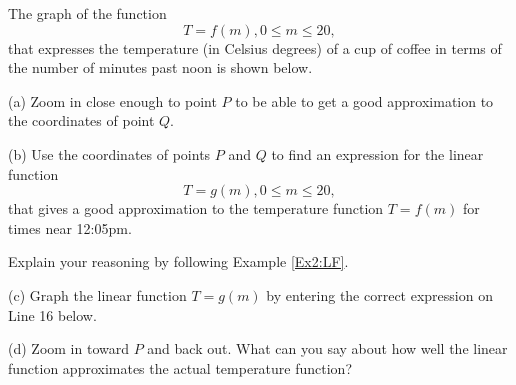 \documentclass{ximera}
\begin{document}
\begin{example} \label{Ex3:LF} The graph of the function
\[
    T = f(m) , 0\leq m \leq 20 ,
\]
that expresses the temperature (in Celsius degrees) of a cup of coffee in terms of the number of minutes past noon is shown below. 

\begin{exploration}\label{Exp1:LF}

(a) Zoom in close enough to point $P$ to be able to get a good approximation to the coordinates of point $Q$. 

(b) Use the coordinates of points $P$ and $Q$ to find an expression for the linear function 
\[
  T = g(m) , 0\leq m \leq 20,
\]
that gives a good approximation to the temperature function $T=f(m)$ for times near 12:05pm. 

Explain your reasoning by following Example \ref{Ex2:LF}.

(c) Graph the linear function $T=g(m)$ by entering the correct expression on Line 16 below.

(d) Zoom in toward $P$ and back out. What can you say about how well the linear function approximates the actual temperature function?

 
\begin{onlineOnly}
    \begin{center}
\end{center}
\end{onlineOnly}
\end{exploration}

\end{example} 
\end{document}
